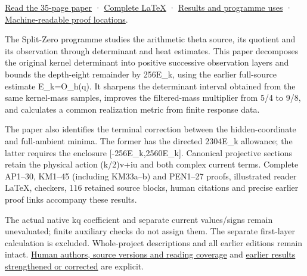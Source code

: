 \documentclass[
]{article}
\begin{document}
\href{https://github.com/KokunoYumeto/zeta-function-research-reader/blob/main/workbenches/splitzero-tandem/continuations/20260922-arithmetic-probe-mass/ARITHMETIC_PROBE_MASS_READER.pdf}{Read
the 35-page paper} ·
\href{https://github.com/KokunoYumeto/zeta-function-research-reader/blob/main/workbenches/splitzero-tandem/continuations/20260922-arithmetic-probe-mass/ARITHMETIC_PROBE_MASS_READER.tex}{Complete
LaTeX} ·
\href{https://github.com/KokunoYumeto/zeta-function-research-reader/blob/main/workbenches/splitzero-tandem/continuations/20260922-arithmetic-probe-mass/RESULTS_20260922_022.md}{Results
and programme uses} ·
\href{https://github.com/KokunoYumeto/zeta-function-research-reader/blob/main/workbenches/splitzero-tandem/continuations/20260922-arithmetic-probe-mass/RESULT_INDEX.json}{Machine-readable
proof locations}.

The Split-Zero programme studies the arithmetic theta source, its
quotient and its observation through determinant and heat estimates.
This paper decomposes the original kernel determinant into positive
successive observation layers and bounds the depth-eight remainder by
256E\_k, using the earlier full-source estimate E\_k=O\_h(q). It
sharpens the determinant interval obtained from the same kernel-mass
samples, improves the filtered-mass multiplier from 5/4 to 9/8, and
calculates a common realization metric from finite response data.

The paper also identifies the terminal correction between the
hidden-coordinate and full-ambient minima. The former has the directed
2304E\_k allowance; the latter requires the enclosure
{[}-256E\_k,2560E\_k{]}. Canonical projective sections retain the
physical action (k/2)v+iu and both complex current terms. Complete
AP1--30, KM1--45 (including KM33a--b) and PEN1--27 proofs, illustrated
reader LaTeX, checkers, 116 retained source blocks, human citations and
precise earlier proof links accompany these results.

The actual native kq coefficient and separate current values/signs
remain unevaluated; finite auxiliary checks do not assign them. The
separate first-layer calculation is excluded. Whole-project descriptions
and all earlier editions remain intact.
\href{https://github.com/KokunoYumeto/zeta-function-research-reader/blob/main/workbenches/splitzero-tandem/continuations/20260922-arithmetic-probe-mass/SOURCE_READING_USE.md}{Human
authors, source versions and reading coverage} and
\href{https://github.com/KokunoYumeto/zeta-function-research-reader/blob/main/workbenches/splitzero-tandem/continuations/20260922-arithmetic-probe-mass/RECEIVER_UPDATES.md}{earlier
results strengthened or corrected} are explicit.
\end{document}
